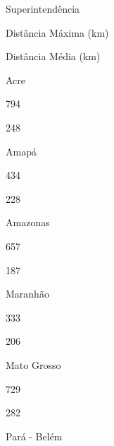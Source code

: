 \documentclass[
  letterpaper,
]{report}
\begin{document}
\n  

\n    

\n      

Superintendência

\n      

Distância Máxima (km)

\n      

Distância Média (km)

\n    

\n  

\n  

\n    

\n      

Acre

\n      

794

\n      

248

\n    

\n    

\n      

Amapá

\n      

434

\n      

228

\n    

\n    

\n      

Amazonas

\n      

657

\n      

187

\n    

\n    

\n      

Maranhão

\n      

333

\n      

206

\n    

\n    

\n      

Mato Grosso

\n      

729

\n      

282

\n    

\n    

\n      

Pará - Belém
\end{document}
